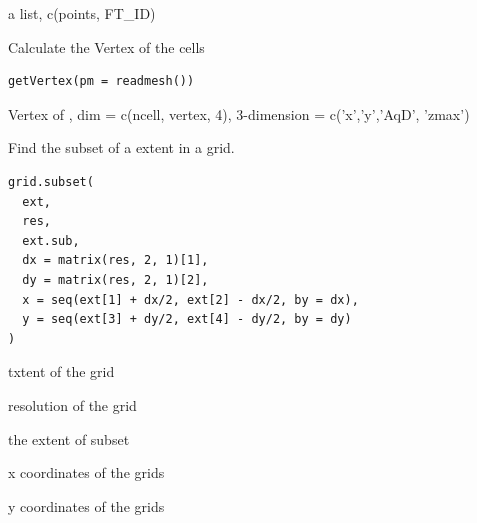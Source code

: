 \documentclass[a4paper]{book}
\begin{document}
%
\begin{Value}
a list, c(points, FT\_ID)
\end{Value}
%
\begin{Description}\relax
Calculate the Vertex of the cells
\end{Description}
%
\begin{Usage}
\begin{verbatim}
getVertex(pm = readmesh())
\end{verbatim}
\end{Usage}
%
\begin{Arguments}
\begin{ldescription}
\item[\code{pm}] 
\end{ldescription}
\end{Arguments}
%
\begin{Value}
Vertex of , dim = c(ncell, vertex, 4), 3-dimension = c('x','y','AqD', 'zmax')
\end{Value}
%
\begin{Description}\relax
Find the subset of a extent in a grid.
\end{Description}
%
\begin{Usage}
\begin{verbatim}
grid.subset(
  ext,
  res,
  ext.sub,
  dx = matrix(res, 2, 1)[1],
  dy = matrix(res, 2, 1)[2],
  x = seq(ext[1] + dx/2, ext[2] - dx/2, by = dx),
  y = seq(ext[3] + dy/2, ext[4] - dy/2, by = dy)
)
\end{verbatim}
\end{Usage}
%
\begin{Arguments}
\begin{ldescription}
\item[\code{ext}] txtent of the grid

\item[\code{res}] resolution of the grid

\item[\code{ext.sub}] the extent of subset

\item[\code{x}] x coordinates of the grids

\item[\code{y}] y coordinates of the grids
\end{ldescription}
\end{Arguments}
\end{document}
